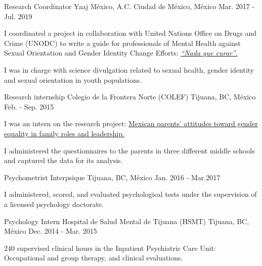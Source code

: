 \begin{cventries}
{\begin{cvitems}
            \end{cvitems}
        }
    \cventry
        {Research Coordinator}
        {Yaaj México, A.C.}
        {Ciudad de México, México}
        {Mar. 2017 - Jul. 2019}
        {
            \begin{cvitems}
                \item {I coordinated a project in collaboration with United Nations Office on Drugs and Crime (UNODC) to write a guide for professionals of Mental Health against Sexual Orientation and Gender Identity Change Efforts:
                    \href{https://www.unodc.org/documents/mexicoandcentralamerica/2019/GUIAECOSIGFINAL-compressed.pdf}{\textit{``Nada que curar''}.}}
                \item {I was in charge with science divulgation related to sexual health, gender identity and sexual orientation in youth populations.}
            \end{cvitems}
        }
     \cventry
        {Research internship}
        {Colegio de la Frontera Norte (COLEF)}
        {Tijuana, BC, México}
        {Feb. - Sep. 2015}
        {
            \begin{cvitems}
                \item {I was an intern on the research project:
                    \href{https://estudiosdemograficosyurbanos.colmex.mx/index.php/edu/article/view/1791/pdf}{Mexican parents’ attitudes toward gender equality in family roles and leadership.}}
                \item {I administered the questionnaires to the parents in three different middle schools and captured the data for its analysis.}
            \end{cvitems}
        }
\end{cventries}
\vspace{-3mm}
\begin{cventries}
    \cventry
        {Psychometrist}
        {Interpsique}
        {Tijuana, BC, México}
        {Jan. 2016 - Mar.2017}
        {
            \begin{cvitems}
                \item {I administered, scored, and evaluated psychological tests under the supervision of a licensed psychology doctorate.}
            \end{cvitems}
        }
    \cventry
        {Psychology Intern}
        {Hospital de Salud Mental de Tijuana (HSMT)}
        {Tijuana, BC, México}
        {Dec. 2014 - Mar. 2015}
        {
            \begin{cvitems}
                \item {240 supervised clinical hours in the Inpatient
                    Psychiatric Care Unit: Occupational and group therapy, and
                clinical evaluations.}
            \end{cvitems}
        }
\end{cventries}
